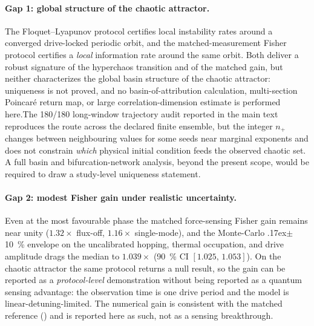 \documentclass[Phys]{SciPost}
\begin{document}
\paragraph{Gap 1: global structure of the chaotic attractor.}
The Floquet--Lyapunov protocol certifies local instability rates around a
converged drive-locked periodic orbit, and the matched-measurement Fisher
protocol certifies a \emph{local} information rate around the same orbit. Both
deliver a robust signature of the hyperchaos transition and of the matched
gain, but neither characterizes the global basin structure of the chaotic
attractor: uniqueness is not proved, and no basin-of-attribution calculation,
multi-section Poincar\'e return map, or large correlation-dimension estimate
is performed here.The 180/180 long-window trajectory audit reported in the main text
reproduces the route across the declared finite ensemble, but the integer
$n_+$ changes between neighbouring values for some seeds near marginal
exponents and does not constrain \emph{which} physical initial condition feeds
the observed chaotic set. A
full basin and bifurcation-network analysis, beyond the present scope, would
be required to draw a study-level uniqueness statement.

\paragraph{Gap 2: modest Fisher gain under realistic uncertainty.}
Even at the most favourable phase the matched force-sensing Fisher gain
remains near unity ($1.32\times$ flux-off, $1.16\times$ single-mode), and the
Monte-Carlo {\raise.17ex\hbox{$\scriptstyle\pm$}}\qty{10}{\percent} envelope on the uncalibrated
hopping, thermal occupation, and drive amplitude drags the median to
$1.039\times$ (\qty{90}{\percent} CI $[1.025,\,1.053]$). On the chaotic attractor
the same protocol returns a null result, so the gain can be reported as a
\emph{protocol-level} demonstration without being reported as a quantum
sensing advantage: the observation time is one drive period and the model is
linear-detuning-limited. The numerical gain is consistent with the matched
reference () and is reported here as such, not
as a sensing breakthrough.
\end{document}
